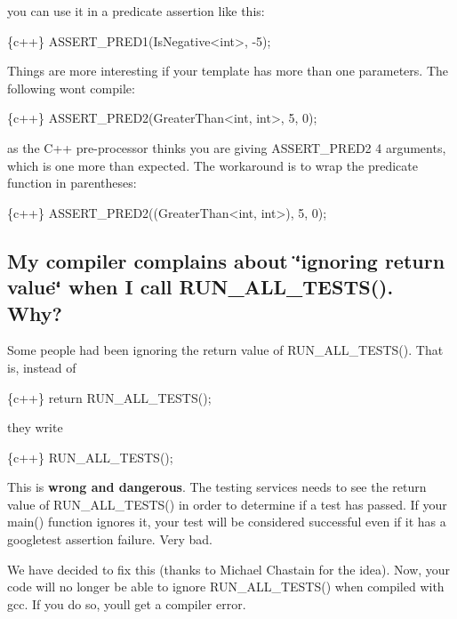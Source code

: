 you can use it in a predicate assertion like this\+:


\begin{DoxyCode}
\{c++\}
ASSERT\_PRED1(IsNegative<int>, -5);
\end{DoxyCode}


Things are more interesting if your template has more than one parameters. The following won\textquotesingle{}t compile\+:


\begin{DoxyCode}
\{c++\}
ASSERT\_PRED2(GreaterThan<int, int>, 5, 0);
\end{DoxyCode}


as the C++ pre-\/processor thinks you are giving {\ttfamily A\+S\+S\+E\+R\+T\+\_\+\+P\+R\+E\+D2} 4 arguments, which is one more than expected. The workaround is to wrap the predicate function in parentheses\+:


\begin{DoxyCode}
\{c++\}
ASSERT\_PRED2((GreaterThan<int, int>), 5, 0);
\end{DoxyCode}


\subsection*{My compiler complains about \char`\"{}ignoring return value\char`\"{} when I call R\+U\+N\+\_\+\+A\+L\+L\+\_\+\+T\+E\+S\+T\+S(). Why?}

Some people had been ignoring the return value of {\ttfamily R\+U\+N\+\_\+\+A\+L\+L\+\_\+\+T\+E\+S\+T\+S()}. That is, instead of


\begin{DoxyCode}
\{c++\}
  return RUN\_ALL\_TESTS();
\end{DoxyCode}


they write


\begin{DoxyCode}
\{c++\}
  RUN\_ALL\_TESTS();
\end{DoxyCode}


This is {\bfseries wrong and dangerous}. The testing services needs to see the return value of {\ttfamily R\+U\+N\+\_\+\+A\+L\+L\+\_\+\+T\+E\+S\+T\+S()} in order to determine if a test has passed. If your {\ttfamily main()} function ignores it, your test will be considered successful even if it has a googletest assertion failure. Very bad.

We have decided to fix this (thanks to Michael Chastain for the idea). Now, your code will no longer be able to ignore {\ttfamily R\+U\+N\+\_\+\+A\+L\+L\+\_\+\+T\+E\+S\+T\+S()} when compiled with {\ttfamily gcc}. If you do so, you\textquotesingle{}ll get a compiler error.

